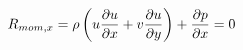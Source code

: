 \documentclass[preview]{standalone}
\begin{document}
\begin{align*}
\special{dvisvgm:raw <g id='unique000'>}R_{mom,x} = \rho \left( u \frac{\partial u}{\partial x} + v \frac{\partial u}{\partial y} \right) + \frac{\partial p}{\partial x} = 0\special{dvisvgm:raw </g>}
\end{align*}
\end{document}
